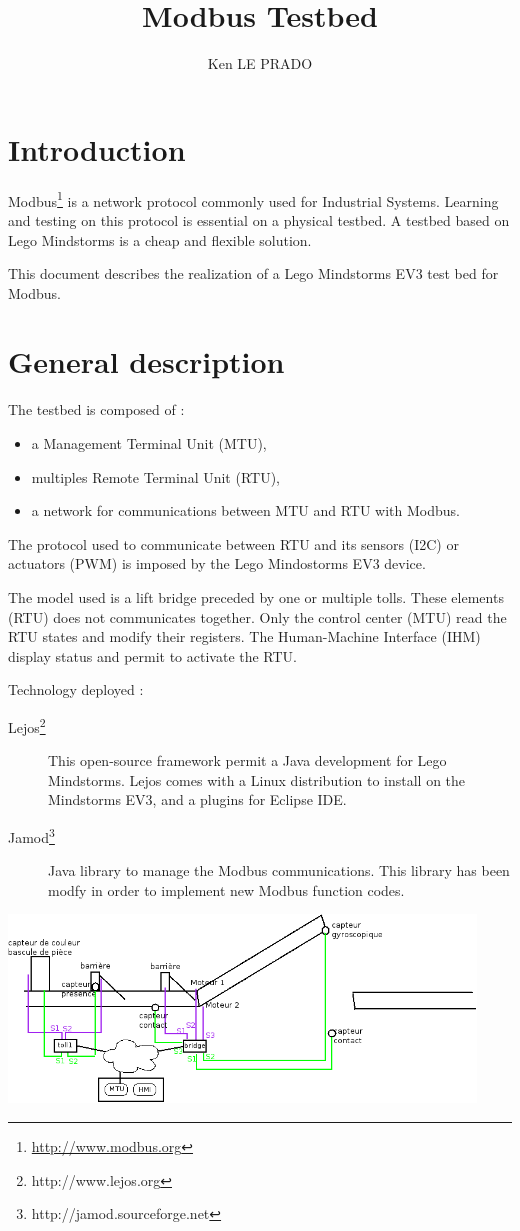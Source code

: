 \documentclass[10pt,a4paper]{article}
\author{Ken LE PRADO}
\title{Modbus Testbed}
\begin{document}
\section{Introduction}
	
	Modbus\footnote{\url{http://www.modbus.org}} is a network protocol commonly used for Industrial Systems.
	Learning and testing on this protocol is essential on a physical testbed.
	A testbed based on Lego Mindstorms is a cheap and flexible solution.
	
	This document describes the realization of a Lego Mindstorms EV3 test bed for Modbus.

\section{General description}
	The testbed is composed of :
	\begin{itemize}
	    \item a Management Terminal Unit (MTU),
	    \item multiples Remote Terminal Unit (RTU),
	    \item a network for communications between MTU and RTU with Modbus.
	\end{itemize}

	The protocol used to communicate between RTU and its sensors (I2C) or actuators (PWM) is imposed by the Lego Mindostorms EV3 device.
		
	The model used is a lift bridge preceded by one or multiple tolls. These elements (RTU) does not communicates together. Only the control center (MTU) read the RTU states and modify their registers. The Human-Machine Interface (IHM) display status and permit to activate the RTU.
	
	
    Technology deployed :    
    \begin{description}
        \item[Lejos\footnote{http://www.lejos.org}] This open-source framework permit a Java development for Lego Mindstorms. Lejos comes with a Linux distribution to install on the Mindstorms EV3, and a plugins for Eclipse IDE.
        \item[Jamod\footnote{http://jamod.sourceforge.net}] Java library to manage the Modbus communications. This library has been modfy in order to implement new Modbus function codes.
    \end{description}
		
	\begin{center}
	\includegraphics[height=5cm]{rsrc/schema_peage-pont.png}
	\end{center}
\end{document}
